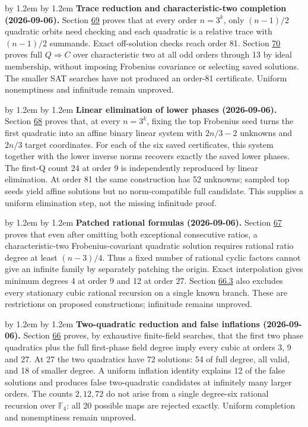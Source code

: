 \documentclass[11pt,reqno]{amsart}
\theoremstyle{plain}
\newenvironment{revnote}%
  {\par\addvspace{0.7\baselineskip}\begingroup\small
   \advance\leftskip by 1.2em \advance\rightskip by 1.2em \noindent\ignorespaces}%
  {\par\endgroup\addvspace{0.7\baselineskip}}
\begin{document}
\begin{revnote}
\textbf{Trace reduction and characteristic-two completion (2026-09-06).} Section \hyperref[sec:69]{69} proves that at every order \(n=3^k\), only \((n-1)/2\) quadratic orbits need checking and each quadratic is a relative trace with \((n-1)/2\) summands. Exact off-solution checks reach order 81. Section \hyperref[sec:70]{70} proves full \(Q\Rightarrow C\) over characteristic two at all odd orders through 13 by ideal membership, without imposing Frobenius covariance or selecting saved solutions. The smaller SAT searches have not produced an order-81 certificate. Uniform nonemptiness and infinitude remain unproved.
\end{revnote}

\begin{revnote}
\textbf{Linear elimination of lower phases (2026-09-06).} Section \hyperref[sec:68]{68} proves that, at every \(n=3^k\), fixing the top Frobenius seed turns the first quadratic into an affine binary linear system with \(2n/3-2\) unknowns and \(2n/3\) target coordinates. For each of the six saved certificates, this system together with the lower inverse norms recovers exactly the saved lower phases. The first-Q count 24 at order 9 is independently reproduced by linear elimination. At order 81 the same construction has 52 unknowns; sampled top seeds yield affine solutions but no norm-compatible full candidate. This supplies a uniform elimination step, not the missing infinitude proof.
\end{revnote}

\begin{revnote}
\textbf{Patched rational formulas (2026-09-06).} Section \hyperref[sec:67]{67} proves that even after omitting both exceptional consecutive ratios, a characteristic-two Frobenius-covariant quadratic solution requires rational ratio degree at least \((n-3)/4\). Thus a fixed number of rational cyclic factors cannot give an infinite family by separately patching the origin. Exact interpolation gives minimum degrees 4 at order 9 and 12 at order 27. Section \hyperref[sec:66.3]{66.3} also excludes every stationary cubic rational recursion on a single known branch. These are restrictions on proposed constructions; infinitude remains unproved.
\end{revnote}

\begin{revnote}
\textbf{Two-quadratic reduction and false inflations (2026-09-06).} Section \hyperref[sec:66]{66} proves, by exhaustive finite-field searches, that the first two phase quadratics plus the full first-phase field degree imply every cubic at orders 3, 9 and 27. At 27 the two quadratics have 72 solutions: 54 of full degree, all valid, and 18 of smaller degree. A uniform inflation identity explains 12 of the false solutions and produces false two-quadratic candidates at infinitely many larger orders. The counts \(2,12,72\) do not arise from a single degree-six rational recursion over \(\mathbb F_4\): all 20 possible maps are rejected exactly. Uniform completion and nonemptiness remain unproved.
\end{revnote}
\end{document}

